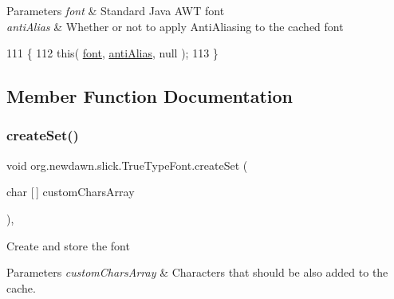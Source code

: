 \begin{DoxyParams}{Parameters}
{\em font} & Standard Java A\+WT font \\
\hline
{\em anti\+Alias} & Whether or not to apply Anti\+Aliasing to the cached font \\
\hline
\end{DoxyParams}

\begin{DoxyCode}
111                                                                \{
112         \textcolor{keyword}{this}( \mbox{\hyperlink{classorg_1_1newdawn_1_1slick_1_1_true_type_font_a7c0b002b6010aa855bf4391ecf749498}{font}}, \mbox{\hyperlink{classorg_1_1newdawn_1_1slick_1_1_true_type_font_a1dc8e98ba06633544ec9f69c434dc126}{antiAlias}}, null );
113     \}
\end{DoxyCode}


\subsection{Member Function Documentation}
\mbox{\label{classorg_1_1newdawn_1_1slick_1_1_true_type_font_ab68a888a4721942a09812e27bccddced}} 
\subsubsection{\texorpdfstring{create\+Set()}{createSet()}}
{\footnotesize\ttfamily void org.\+newdawn.\+slick.\+True\+Type\+Font.\+create\+Set (\begin{DoxyParamCaption}\item[{char \mbox{[}$\,$\mbox{]}}]{custom\+Chars\+Array }\end{DoxyParamCaption})\hspace{0.3cm}{\ttfamily [inline]}, {\ttfamily [private]}}

Create and store the font


\begin{DoxyParams}{Parameters}
{\em custom\+Chars\+Array} & Characters that should be also added to the cache. \\
\hline
\end{DoxyParams}

